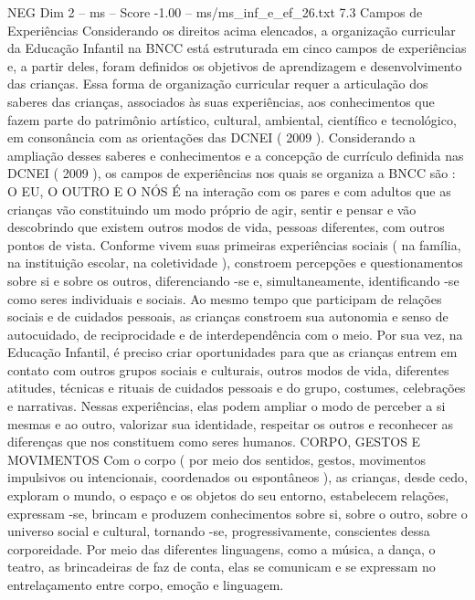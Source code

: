 \begin{textsample}{NEG Dim 2 – ms – Score -1.00 – ms/ms\_inf\_e\_ef\_26.txt}  \label{ex:f2_neg_241}
7.3 Campos de Experiências Considerando os direitos acima elencados, a organização curricular da Educação Infantil na BNCC está estruturada em cinco campos de experiências e, a partir deles, foram definidos os objetivos de aprendizagem e desenvolvimento das crianças.
Essa forma de organização curricular requer a articulação dos saberes das crianças, associados às suas experiências, aos conhecimentos que fazem parte do patrimônio artístico, cultural, ambiental, científico e tecnológico, em consonância com as orientações das DCNEI ( 2009 ).
Considerando a ampliação desses saberes e conhecimentos e a concepção de currículo definida nas DCNEI ( 2009 ), os campos de experiências nos quais se organiza a BNCC são : O EU, O OUTRO E O NÓS É na interação com os pares e com adultos que as crianças vão constituindo um modo próprio de agir, sentir e pensar e vão descobrindo que existem outros modos de vida, pessoas diferentes, com outros pontos de vista.
Conforme vivem suas primeiras experiências sociais ( na família, na instituição escolar, na coletividade ), constroem percepções e questionamentos sobre si e sobre os outros, diferenciando -se e, simultaneamente, identificando -se como seres individuais e sociais.
Ao mesmo tempo que participam de relações sociais e de cuidados pessoais, as crianças constroem sua autonomia e senso de autocuidado, de reciprocidade e de interdependência com o meio.
Por sua vez, na Educação Infantil, é preciso criar oportunidades para que as crianças entrem em contato com outros grupos sociais e culturais, outros modos de vida, diferentes atitudes, técnicas e rituais de cuidados pessoais e do grupo, costumes, celebrações e narrativas.
Nessas experiências, elas podem ampliar o modo de perceber a si mesmas e ao outro, valorizar sua identidade, respeitar os outros e reconhecer as diferenças que nos constituem como seres humanos.
CORPO, GESTOS E MOVIMENTOS Com o corpo ( por meio dos sentidos, gestos, movimentos impulsivos ou intencionais, coordenados ou espontâneos ), as crianças, desde cedo, exploram o mundo, o espaço e os objetos do seu entorno, estabelecem relações, expressam -se, brincam e produzem conhecimentos sobre si, sobre o outro, sobre o universo social e cultural, tornando -se, progressivamente, conscientes dessa corporeidade.
Por meio das diferentes linguagens, como a música, a dança, o teatro, as brincadeiras de faz de conta, elas se comunicam e se expressam no entrelaçamento entre corpo, emoção e linguagem.

\end{textsample}
